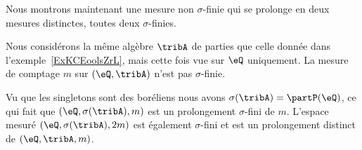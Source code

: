 
\begin{example}
    Nous montrons maintenant une mesure non \( \sigma\)-finie qui se prolonge en deux mesures distinctes, toutes deux \( \sigma\)-finies.

    Nous considérons la même algèbre \( \tribA\) de parties que celle donnée dans l'exemple~\ref{ExKCEoolsZrL}, mais cette fois vue sur \( \eQ\) uniquement. La mesure de comptage \( m\) sur \( (\eQ,\tribA)\) n'est pas \( \sigma\)-finie.

    Vu que les singletons sont des boréliens nous avons \( \sigma(\tribA)=\partP(\eQ)\), ce qui fait que \( (\eQ,\sigma(\tribA),m)\) est un prolongement \( \sigma\)-fini de \( m\). L'espace mesuré \( (\eQ,\sigma(\tribA),2m)\) est également \( \sigma\)-fini et est un prolongement distinct de \( (\eQ,\tribA,m)\).
\end{example}
